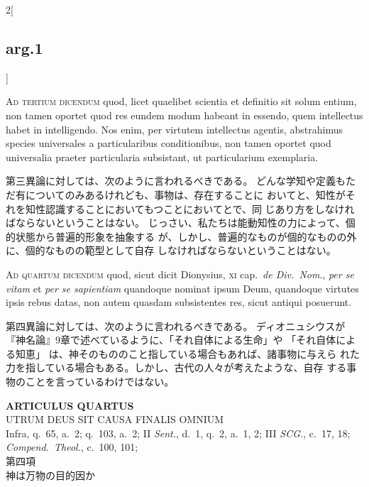 \documentclass[paper=a4paper,fontsize=10pt,jafontsize=9pt,titlepage]{jlreq}
\begin{document}
\begin{paracol}{2}[\subsection{arg.1}]
\switchcolumn*[\subsection{ad.3}]

{\scshape Ad tertium dicendum} quod, licet quaelibet
scientia et definitio sit solum entium, non tamen oportet quod res
eundem modum habeant in essendo, quem intellectus habet in
intelligendo. Nos enim, per virtutem intellectus agentis, abstrahimus
species universales a particularibus conditionibus, non tamen oportet
quod universalia praeter particularia subsistant, ut particularium
exemplaria.

\switchcolumn

第三異論に対しては、次のように言われるべきである。
どんな学知や定義もただ有についてのみあるけれども、事物は、存在することに
 おいてと、知性がそれを知性認識することにおいてもつことにおいてとで、同
 じあり方をしなければならないということはない。
じっさい、私たちは能動知性の力によって、個的状態から普遍的形象を抽象する
 が、しかし、普遍的なものが個的なものの外に、個的なものの範型として自存
 しなければならないということはない。

\switchcolumn*[\subsection{ad.4}]

{\scshape Ad quartum dicendum} quod, sicut dicit Dionysius, {\scshape
xi} cap.~{\itshape de Div.~Nom}., {\itshape per se vitam} et {\itshape
per se sapientiam} quandoque nominat ipsum Deum, quandoque virtutes
ipsis rebus datas, non autem quasdam subsistentes res, sicut antiqui
posuerunt.

\switchcolumn

第四異論に対しては、次のように言われるべきである。
ディオニュシウスが『神名論』9章で述べているように、「それ自体による生命」や
 「それ自体による知恵」 は、神そのもののこと指している場合もあれば、諸事物に与えら
 れた力を指している場合もある。しかし、古代の人々が考えたような、自存
 する事物のことを言っているわけではない。

\end{paracol}
\newpage
{}
{}
\setcounter{section}{4}
\setcounter{subsection}{0}



\begin{center}
 {\Large {\bfseries ARTICULUS QUARTUS}}\\
 {\large UTRUM DEUS SIT CAUSA FINALIS OMNIUM}\\
 {\footnotesize Infra, q.~65, a.~2; q.~103, a.~2; II {\itshape Sent.},
 d.~1, q.~2, a.~1, 2; III {\itshape SCG.}, c.~17, 18; {\itshape
 Compend.~Theol.}}, c.~100, 101;\\
 {\Large 第四項\\神は万物の目的因か}
\end{center}
\end{document}
